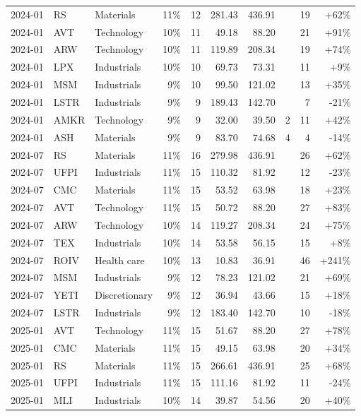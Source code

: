 \documentclass[11pt,a4paper]{article}
\begin{document}
{\begin{longtable}{l l l r r r r r r r}
2024-01 & RS & Materials & 11\% & 12 & 281.43 & 436.91 &  & 19 & +62\% \\
2024-01 & AVT & Technology & 10\% & 11 & 49.18 & 88.20 &  & 21 & +91\% \\
2024-01 & ARW & Technology & 10\% & 11 & 119.89 & 208.34 &  & 19 & +74\% \\
2024-01 & LPX & Industrials & 10\% & 10 & 69.73 & 73.31 &  & 11 & +9\% \\
2024-01 & MSM & Industrials & 9\% & 10 & 99.50 & 121.02 &  & 13 & +35\% \\
2024-01 & LSTR & Industrials & 9\% & 9 & 189.43 & 142.70 &  & 7 & -21\% \\
2024-01 & AMKR & Technology & 9\% & 9 & 32.00 & 39.50 & 2 & 11 & +42\% \\
2024-01 & ASH & Materials & 9\% & 9 & 83.70 & 74.68 & 4 & 4 & -14\% \\
2024-07 & RS & Materials & 11\% & 16 & 279.98 & 436.91 &  & 26 & +62\% \\
2024-07 & UFPI & Industrials & 11\% & 15 & 110.32 & 81.92 &  & 12 & -23\% \\
2024-07 & CMC & Materials & 11\% & 15 & 53.52 & 63.98 &  & 18 & +23\% \\
2024-07 & AVT & Technology & 11\% & 15 & 50.72 & 88.20 &  & 27 & +83\% \\
2024-07 & ARW & Technology & 10\% & 14 & 119.27 & 208.34 &  & 24 & +75\% \\
2024-07 & TEX & Industrials & 10\% & 14 & 53.58 & 56.15 &  & 15 & +8\% \\
2024-07 & ROIV & Health care & 10\% & 13 & 10.83 & 36.91 &  & 46 & +241\% \\
2024-07 & MSM & Industrials & 9\% & 12 & 78.23 & 121.02 &  & 21 & +69\% \\
2024-07 & YETI & Discretionary & 9\% & 12 & 36.94 & 43.66 &  & 15 & +18\% \\
2024-07 & LSTR & Industrials & 9\% & 12 & 183.40 & 142.70 &  & 10 & -18\% \\
2025-01 & AVT & Technology & 11\% & 15 & 51.67 & 88.20 &  & 27 & +78\% \\
2025-01 & CMC & Materials & 11\% & 15 & 49.15 & 63.98 &  & 20 & +34\% \\
2025-01 & RS & Materials & 11\% & 15 & 266.61 & 436.91 &  & 25 & +68\% \\
2025-01 & UFPI & Industrials & 11\% & 15 & 111.16 & 81.92 &  & 11 & -24\% \\
2025-01 & MLI & Industrials & 10\% & 14 & 39.87 & 54.56 &  & 20 & +40\% \\

\end{longtable}}
\end{document}
